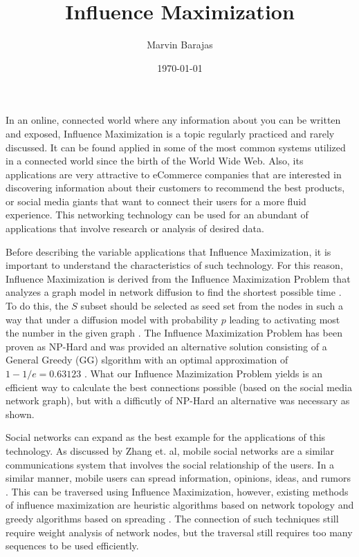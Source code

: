 \documentclass{article}
\title{Influence Maximization}
\author{Marvin Barajas}
\date{\today}			%
\begin{document}
\maketitle			%

In an online, connected world where any information about you can be written and exposed, Influence Maximization is a topic regularly practiced and rarely discussed. 
It can be found applied in some of the most common systems utilized in a connected world since the birth of the World Wide Web. 
Also, its applications are very attractive to eCommerce companies that are interested in discovering information about their customers to recommend the best products, or social media giants that want to connect their users for a more fluid experience. 
This networking technology can be used for an abundant of applications that involve research or analysis of desired data. 

Before describing the variable applications that Influence Maximization, it is important to understand the characteristics of such technology. 
For this reason, Influence Maximization is derived from the Influence Maximization Problem that analyzes a graph model in network diffusion to find the shortest possible time \cite{9721514}. 
To do this, the $S$ subset should be selected as seed set from the nodes in such a way that under a diffusion model with probability $p$ leading to activating most the number in the given graph \cite{9721514}. 
The Influence Maximization Problem has been proven as NP-Hard and was provided an alternative solution consisting of a  General Greedy (GG) slgorithm with an optimal approximation of $1-1/e=0.63123$ \cite{9721514}. 
What our Influence Mazimization Problem yields is an efficient way to calculate the best connections possible (based on the social media network graph), but with a difficutly of NP-Hard an alternative was necessary as shown. 

Social networks can expand as the best example for the applications of this technology. As discussed by Zhang et. al, mobile social networks are a similar communications system that involves the social relationship of the users. 
In a similar manner, mobile users can spread information, opinions, ideas, and rumors \cite{9744500}. 
This can be traversed using Influence Maximization, however, existing methods of influence maximization are heuristic algorithms based on network topology and greedy algorithms based on spreading \cite{9744500}. 
The connection of such techniques still require weight analysis of network nodes, but the traversal still requires too many sequences to be used efficiently.



\begin{thebibliography}{99}	%

\end{thebibliography}
\end{document}
